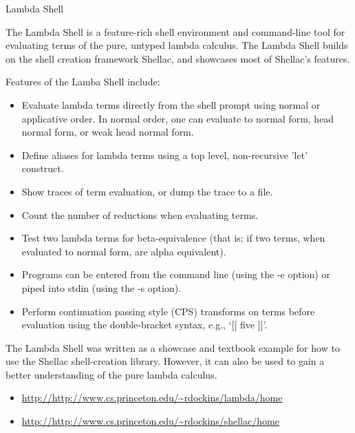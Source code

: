 \documentclass{article}
\begin{document}
\begin{hcarentry}{Lambda Shell}
\makeheader

The Lambda Shell is a feature-rich shell environment and command-line
tool for evaluating terms of the pure, untyped lambda calculus.  The Lambda
Shell builds on the shell creation framework Shellac, and showcases
most of Shellac's features.

Features of the Lamba Shell include:

\begin{itemize}
\item Evaluate lambda terms directly from the shell prompt using
      normal or applicative order.  In normal order, one can evaluate
      to normal form, head normal form, or weak head normal form.
\item Define aliases for lambda terms using a top level, non-recursive
      'let' construct.
\item Show traces of term evaluation, or dump the trace to a file.
\item Count the number of reductions when evaluating terms.
\item Test two lambda terms for beta-equivalence (that is; if two
      terms, when evaluated to normal form, are alpha equivalent).
\item Programs can be entered from the command line (using the -e option)
      or piped into stdin (using the -s option).
\item Perform continuation passing style (CPS) transforms on terms before
      evaluation using the double-bracket syntax, e.g.,  `[[ five ]]'.
\end{itemize}


The Lambda Shell was written as a showcase and textbook
example for how to use the Shellac shell-creation library.
However, it can also be used to gain a better understanding
of the pure lambda calculus.


\FurtherReading
\begin{itemize}
\item \url{http://http://www.cs.princeton.edu/~rdockins/lambda/home}
\item \url{http://http://www.cs.princeton.edu/~rdockins/shellac/home}
\end{itemize}
\end{hcarentry}
\end{document}
